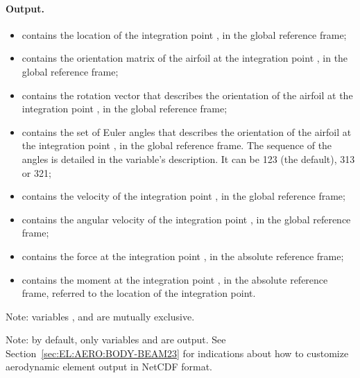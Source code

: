 \paragraph{Output.}
\begin{itemize}
\item {} contains the location
of the integration point , in the global reference frame;

\item {} contains the orientation matrix
of the airfoil at the integration point , in the global reference frame;

\item {} contains the rotation vector
that describes the orientation of the airfoil at the integration point ,
in the global reference frame;

\item {} contains the set of Euler angles
that describes the orientation of the airfoil at the integration point ,
in the global reference frame.
The sequence of the angles is detailed in the variable's description.
It can be 123 (the default), 313 or 321;

\item {} contains the velocity
of the integration point , in the global reference frame;

\item {} contains the angular velocity
of the integration point , in the global reference frame;

\item {} contains the force
at the integration point , in the absolute reference frame;

\item {} contains the moment
at the integration point , in the absolute reference frame,
referred to the location of the integration point.
\end{itemize}

Note: variables ,  and 
are mutually exclusive.

Note: by default, only variables 
and  are output.
See Section~\ref{sec:EL:AERO:BODY-BEAM23} for indications
about how to customize aerodynamic element output in NetCDF format.


